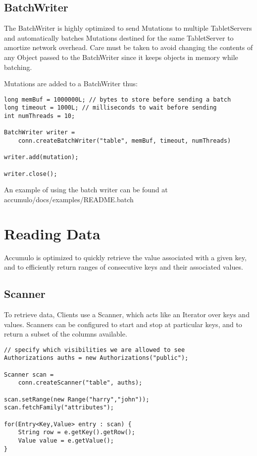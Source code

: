 \subsection{BatchWriter}
The BatchWriter is highly optimized to send Mutations to multiple TabletServers
and automatically batches Mutations destined for the same TabletServer to
amortize network overhead. Care must be taken to avoid changing the contents of
any Object passed to the BatchWriter since it keeps objects in memory while
batching.

Mutations are added to a BatchWriter thus:

\small
\begin{verbatim}
long memBuf = 1000000L; // bytes to store before sending a batch
long timeout = 1000L; // milliseconds to wait before sending
int numThreads = 10;

BatchWriter writer =
    conn.createBatchWriter("table", memBuf, timeout, numThreads)

writer.add(mutation);

writer.close();
\end{verbatim}
\normalsize

An example of using the batch writer can be found at\\
accumulo/docs/examples/README.batch

\section{Reading Data}

Accumulo is optimized to quickly retrieve the value associated with a given key, and
to efficiently return ranges of consecutive keys and their associated values.

\subsection{Scanner}

To retrieve data, Clients use a Scanner, which acts like an Iterator over
keys and values. Scanners can be configured to start and stop at particular keys, and
to return a subset of the columns available.

\small
\begin{verbatim}
// specify which visibilities we are allowed to see
Authorizations auths = new Authorizations("public");

Scanner scan =
    conn.createScanner("table", auths);

scan.setRange(new Range("harry","john"));
scan.fetchFamily("attributes");

for(Entry<Key,Value> entry : scan) {
    String row = e.getKey().getRow();
    Value value = e.getValue();
}
\end{verbatim}
\normalsize

